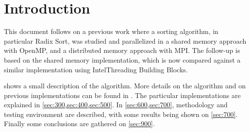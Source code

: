 \section{Introduction}
\label{sec:100}

This document follows on a previous work where a sorting algorithm, in particular Radix Sort, was studied and parallelized in a shared memory approach with OpenMP, and a distributed memory approach with MPI. The follow-up is based on the shared memory implementation, which is now compared against a similar implementation using Intel\tr Threading Building Blocks.

 shows a small description of the algorithm. More details on the algorithm and on previous implementations can be found in \cite{naps62sort}. The particular implementations are explained in \cref{sec:300,sec:400,sec:500}. In \cref{sec:600,sec:700}, methodology and testing environment are described, with some results being shown on \cref{sec:700}. Finally some conclusions are gathered on \cref{sec:900}. 